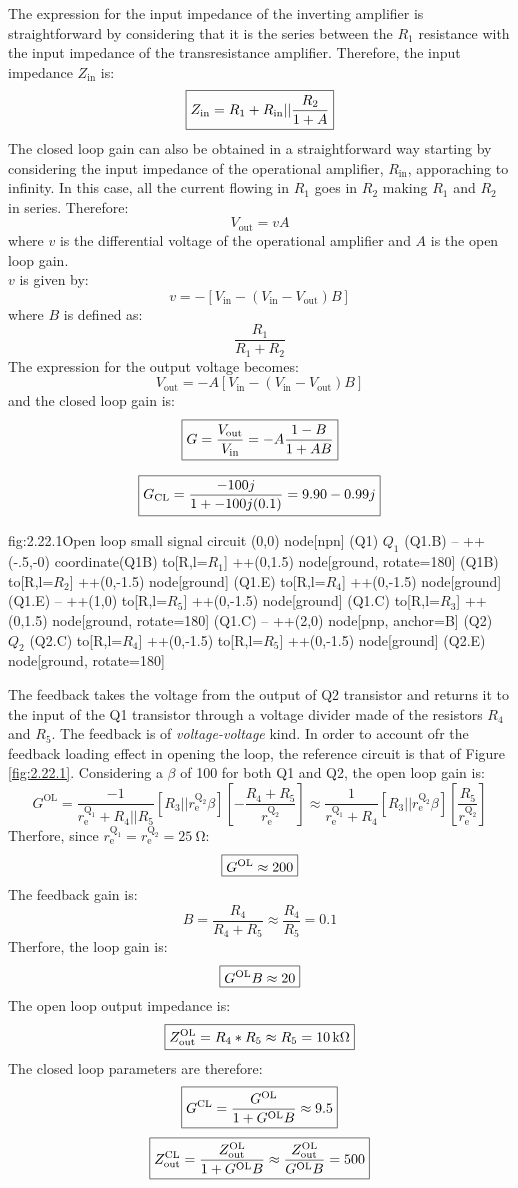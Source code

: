 The expression for the input impedance of the inverting amplifier is straightforward by considering that it is the series between the $R_1$ resistance with the input impedance of the transresistance amplifier. Therefore, the input impedance $Z_{\text{in}}$ is:
\[\boxed{Z_\text{in}=R_1+R_\text{in}||\frac{R_2}{1+A}}\]
The closed loop gain can also be obtained in a straightforward way starting by considering the input impedance of the operational amplifier, $R_\text{in}$, apporaching to infinity. In this case, all the current flowing in $R_1$ goes in $R_2$ making $R_1$ and $R_2$ in series. Therefore:
\[V_\text{out}=vA\]
where $v$ is the differential voltage of the operational amplifier and $A$ is the open loop gain.\\
$v$ is given by:
\[v=-[V_\text{in}-(V_\text{in}-V_\text{out})B]\]
where $B$ is defined as:
\[\frac{R_1}{R_1+R_2}\]
The expression for the output voltage becomes:
\[V_\text{out}=-A[V_\text{in}-(V_\text{in}-V_\text{out})B]\]
and the closed loop gain is:
\[\boxed{G=\frac{V_\text{out}}{V_\text{in}}=-A\frac{1-B}{1+AB}}\]

\[\boxed{G_{\text{CL}}=\frac{-100j}{1+-100j(0.1)}=9.90-0.99j}\]

\begin{circuit}{fig:2.22.1}{Open loop small signal circuit}
    (0,0) node[npn] (Q1) {$Q_1$}
    (Q1.B) -- ++(-.5,-0) coordinate(Q1B)
    to[R,l=$R_1$] ++(0,1.5)
    node[ground, rotate=180] {}
    (Q1B) to[R,l=$R_2$] ++(0,-1.5)
    node[ground] {}
    (Q1.E) to[R,l=$R_4$] ++(0,-1.5)
    node[ground] {}
    (Q1.E) -- ++(1,0)
    to[R,l=$R_5$] ++(0,-1.5)
    node[ground] {}
    (Q1.C) to[R,l=$R_3$] ++(0,1.5)
    node[ground, rotate=180] {}
    (Q1.C) -- ++(2,0)
    node[pnp, anchor=B] (Q2) {$Q_2$}
    (Q2.C) to[R,l=$R_4$] ++(0,-1.5)
    to[R,l=$R_5$] ++(0,-1.5)
    node[ground] {}
    (Q2.E) node[ground, rotate=180] {}
\end{circuit}
The feedback takes the voltage from the output of Q2 transistor and returns it to the input of the Q1 transistor through a voltage divider made of the resistors $R_4$ and $R_5$. The feedback is of \textit{voltage-voltage} kind. In order to account ofr the feedback loading effect in opening the loop, the reference circuit is that of Figure \ref{fig:2.22.1}. Considering a $\beta$ of 100 for both Q1 and Q2, the open loop gain is:
\[G^{\text{OL}}=\frac{-1}{r_\text{e}^{\text{Q}_1}+R_4||R_5}\left[R_3||r_\text{e}^{\text{Q}_2}\beta\right]\left[-\frac{R_4+R_5}{r_\text{e}^{\text{Q}_2}}\right]\approx\frac{1}{r_\text{e}^{\text{Q}_1}+R_4}\left[R_3||r_\text{e}^{\text{Q}_2}\beta\right]\left[\frac{R_5}{r_\text{e}^{\text{Q}_2}}\right]\]
Therfore, since $r_\text{e}^{\text{Q}_1} = r_\text{e}^{\text{Q}_2}=\SI{25}{\ohm}$:
\[\boxed{G^{\text{OL}}\approx200}\]
The feedback gain is:
\[B=\frac{R_4}{R_4+R_5}\approx\frac{R_4}{R_5}=0.1\]
Therfore, the loop gain is:
\[\boxed{G^{\text{OL}}B\approx20}\]
The open loop output impedance is:
\[\boxed{Z_\text{out}^\text{OL}=R_4*R_5\approx R_5=\SI{10}{\kilo\ohm}}\]
The closed loop parameters are therefore:
\[\boxed{G^\text{CL}=\frac{G^\text{OL}}{1+G^\text{OL}B}\approx9.5}\]
\[\boxed{Z_\text{out}^\text{CL}=\frac{Z_\text{out}^\text{OL}}{1+G^\text{OL}B}\approx\frac{Z_\text{out}^\text{OL}}{G^\text{OL}B}=500}\]

